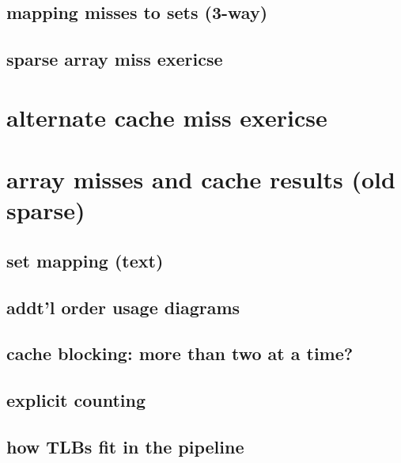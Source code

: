 \subsection{mapping misses to sets (3-way)}


\subsection{sparse array miss exericse}


\section{alternate cache miss exericse}


\section{array misses and cache results (old sparse)}


\subsection{set mapping (text)}




\subsection{addt'l order usage diagrams}

\subsection{cache blocking: more than two at a time?}

%


\subsection{explicit counting}


\subsection{how TLBs fit in the pipeline}


